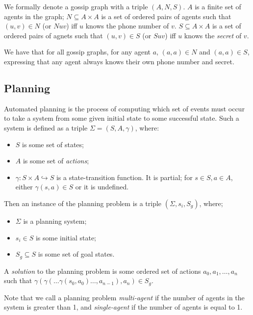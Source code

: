 \documentclass[12pt, a4paper]{article}
\begin{document}
\bigskip

We formally denote a gossip graph  with a triple $(A, N, S)$. $A$ is a
finite set of agents in the graph; $N \subseteq A \times A$ is a set of ordered
pairs of agents such that $(u, v) \in N$ (or $Nuv$) iff $u$ knows the phone
number of $v$. $S \subseteq A \times A$ is a set of ordered pairs of agnets such
that $(u, v) \in S$ (or $Suv$) iff $u$ knows the \textit{secret} of $v$.

We have that for all gossip graphs, for any agent $a$, $(a, a) \in N$ and $(a, a)
 \in S$, expressing that any agent always knows their own phone number and
 secret. 

\subsection{Planning}

Automated planning is the process of computing which set of events must occur to
take a system from some given initial state to some successful state. Such a
system is defined as a triple $\Sigma = (S, A, \gamma)$, where:

\begin{itemize}
\item $S$ is some set of states;
\item $A$ is some set of \textit{actions};
\item $\gamma : S \times A \hookrightarrow S$ is a state-transition function. It
  is partial; for $s \in S, a \in A$, either $\gamma(s, a) \in S$ or it is
  undefined. 
\end{itemize}

Then an instance of the planning problem is a triple $(\Sigma, s_i, S_g)$,
where;

\begin{itemize}
\item $\Sigma$ is a planning system;
\item $s_i \in S$ is some initial state;
\item $S_g \subseteq S$ is some set of goal states.  
\end{itemize}

A \textit{solution} to the planning problem is some ordered set of actions
${a_0, a_1, \ldots, a_n}$ such that $\gamma(\gamma(\ldots \gamma(s_0, a_0)
\ldots ,a_{n-1}) ,a_n) \in S_g$. 

Note that we call a planning problem \textit{multi-agent} if the number of
agents in the system is greater than 1, and \textit{single-agent} if the number
of agents is equal to 1. 
\end{document}
